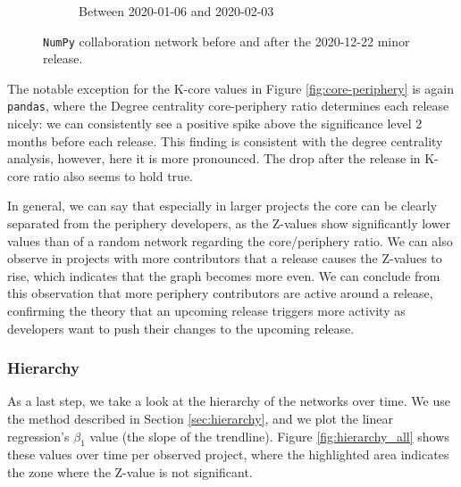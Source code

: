 \begin{figure}
\begin{subfigure}{0.49\textwidth}
        \caption{Between 2020-01-06 and 2020-02-03}
        \label{fig:numpy-after}
    \end{subfigure}
    \caption{\texttt{NumPy} collaboration network before and after the 2020-12-22 minor release.}
    \label{fig:core-periphery-numpy}
\end{figure}

The notable exception for the K-core values in Figure \ref{fig:core-periphery} is again \texttt{pandas}, where the Degree centrality core-periphery ratio determines each release nicely: we can consistently see a positive spike above the significance level 2 months before each release. This finding is consistent with the degree centrality analysis, however, here it is more pronounced. The drop after the release in K-core ratio also seems to hold true.

In general, we can say that especially in larger projects the core can be clearly separated from the periphery developers, as the Z-values show significantly lower values than of a random network regarding the core/periphery ratio. We can also observe in projects with more contributors that a release causes the Z-values to rise, which indicates that the graph becomes more even. We can conclude from this observation that more periphery contributors are active around a release, confirming the theory that an upcoming release triggers more activity as developers want to push their changes to the upcoming release.

\subsubsection{Hierarchy}

As a last step, we take a look at the hierarchy of the networks over time. We use the method described in Section \ref{sec:hierarchy}, and we plot the linear regression's $\beta_1$ value (the slope of the trendline). Figure \ref{fig:hierarchy_all} shows these values over time per observed project, where the highlighted area indicates the zone where the Z-value is not significant.

